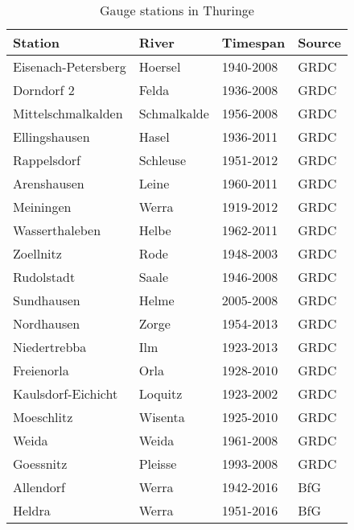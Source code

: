 \begin{table}[H]
\footnotesize
 \centering
 \caption{Gauge stations in Thuringe}
 \label{quelle_runoff_th}
 \begin{tabular}{|l|l|l|l|}
  \hline
  \textbf{Station}&\textbf{River}&\textbf{Timespan}&\textbf{Source}\\
  \hline
  Eisenach-Petersberg&Hoersel&1940-2008&GRDC\\
  Dorndorf 2&Felda&1936-2008&GRDC\\
  Mittelschmalkalden&Schmalkalde&1956-2008&GRDC\\
  Ellingshausen&Hasel&1936-2011&GRDC\\
  Rappelsdorf&Schleuse&1951-2012&GRDC\\
  Arenshausen&Leine&1960-2011&GRDC\\
  Meiningen&Werra&1919-2012&GRDC\\
  Wasserthaleben&Helbe&1962-2011&GRDC\\
  Zoellnitz&Rode&1948-2003&GRDC\\
  Rudolstadt&Saale&1946-2008&GRDC\\
  Sundhausen&Helme&2005-2008&GRDC\\
  Nordhausen&Zorge&1954-2013&GRDC\\
  Niedertrebba&Ilm&1923-2013&GRDC\\
  Freienorla&Orla&1928-2010&GRDC\\
  Kaulsdorf-Eichicht&Loquitz&1923-2002&GRDC\\
  Moeschlitz&Wisenta&1925-2010&GRDC\\
  Weida&Weida&1961-2008&GRDC\\
  Goessnitz&Pleisse&1993-2008&GRDC\\
  Allendorf&Werra&1942-2016&BfG\\
  Heldra&Werra&1951-2016&BfG\\
  \hline
 \end{tabular}
\end{table}



